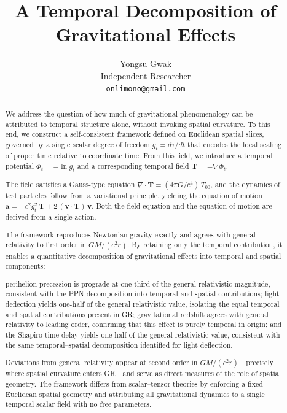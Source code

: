 \documentclass[12pt]{article}
\title{A Temporal Decomposition of Gravitational Effects}
\author{Yongsu Gwak\\[6pt]\normalsize Independent Researcher\\[2pt]\normalsize\texttt{onlimono@gmail.com}}
\date{}
\begin{document}
\maketitle

\begin{abstract}

We address the question of how much of gravitational phenomenology can be attributed to temporal structure alone, without invoking spatial curvature. To this end, we construct a self-consistent framework defined on Euclidean spatial slices, governed by a single scalar degree of freedom $g_t = d\tau/dt$ that encodes the local scaling of proper time relative to coordinate time. From this field, we introduce a temporal potential $\Phi_t = -\ln g_t$ and a corresponding temporal field $\mathbf{T} = -\nabla\Phi_t$.

The field satisfies a Gauss-type equation $\nabla \cdot \mathbf{T} = (4\pi G/c^4)\, T_{00}$, and the dynamics of test particles follow from a variational principle, yielding the equation of motion $\mathbf{a} = -c^2 g_t^2\,\mathbf{T} + 2\,(\mathbf{v}\cdot\mathbf{T})\,\mathbf{v}$. Both the field equation and the equation of motion are derived from a single action.

The framework reproduces Newtonian gravity exactly and agrees with general relativity to first order in $GM/(c^2 r)$. By retaining only the temporal contribution, it enables a quantitative decomposition of gravitational effects into temporal and spatial components:

perihelion precession is prograde at one-third of the general relativistic magnitude, consistent with the PPN decomposition into temporal and spatial contributions; light deflection yields one-half of the general relativistic value, isolating the equal temporal and spatial contributions present in GR; gravitational redshift agrees with general relativity to leading order, confirming that this effect is purely temporal in origin; and the Shapiro time delay yields one-half of the general relativistic value, consistent with the same temporal--spatial decomposition identified for light deflection.

Deviations from general relativity appear at second order in $GM/(c^2 r)$---precisely where spatial curvature enters GR---and serve as direct measures of the role of spatial geometry. The framework differs from scalar--tensor theories by enforcing a fixed Euclidean spatial geometry and attributing all gravitational dynamics to a single temporal scalar field with no free parameters.

\end{abstract}
\end{document}
